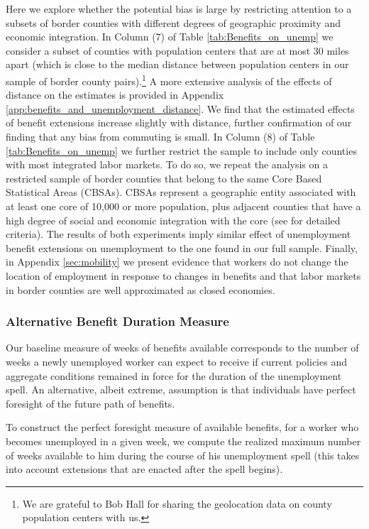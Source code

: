 \documentclass[12pt]{article}
\newcommand{\1}{\mathbf{1}}
\begin{document}
Here we explore whether the potential bias is large by restricting attention to a subsets of border counties with different degrees of geographic proximity and economic integration. In Column (7) of Table \ref{tab:Benefits_on_unemp} we consider a subset of counties with population centers that are at most 30 miles apart (which is close to the median distance between population centers in our sample of border county pairs).\footnote{We are grateful to Bob Hall for sharing the geolocation data on county population centers with us.} A more extensive analysis of the effects of distance on the estimates is provided in Appendix \ref{app:benefits_and_unemployment_distance}. We find that the estimated effects of benefit extensions increase slightly with distance, further confirmation of our finding that any bias from commuting is small. In Column (8) of Table \ref{tab:Benefits_on_unemp} we further restrict the sample to include only counties with most integrated labor markets. To do so, we repeat the analysis on a restricted sample of border counties that belong to the same Core Based Statistical Areas (CBSAs). CBSAs represent a geographic entity associated with at least one core of 10,000 or more population, plus adjacent counties that have a high degree of social and economic integration with the core (see \citet{omb:2010} for detailed criteria). The results of both experiments imply similar effect of unemployment benefit extensions on unemployment to the one found in our full sample. Finally, in Appendix \ref{sec:mobility} we present evidence that workers do not change the location of employment in response to changes in benefits and that labor markets in border counties are well approximated as closed economies.


\subsubsection{Alternative Benefit Duration Measure}
\label{sec:perfect_foresight}

Our baseline measure of weeks of benefits available corresponds to the number of weeks a newly unemployed worker can expect to receive if current policies and aggregate conditions remained in force for the duration of the unemployment spell. An alternative, albeit extreme, assumption is that individuals have perfect foresight of the future path of benefits.

To construct the perfect foresight measure of available benefits, for a worker who becomes unemployed in a given week, we compute the realized maximum number of weeks available to him during the course of his unemployment spell (this takes into account extensions that are enacted after the spell begins).
\end{document}
